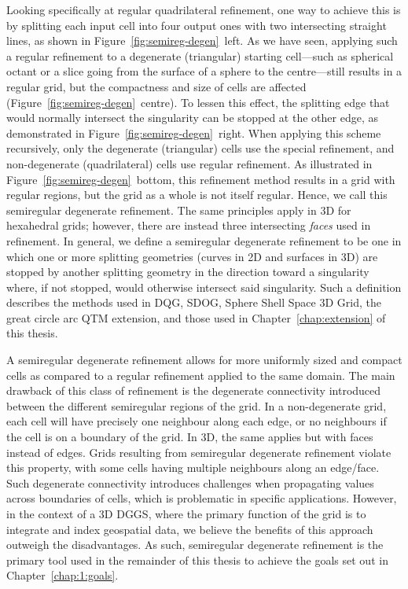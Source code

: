 Looking specifically at regular quadrilateral refinement, one way to achieve this is by splitting each input cell into four output ones with two intersecting straight lines, as shown in Figure~\ref{fig:semireg-degen}~left.
As we have seen, applying such a regular refinement to a degenerate (triangular) starting cell---such as spherical octant or a slice going from the surface of a sphere to the centre---still results in a regular grid, but the compactness and size of cells are affected (Figure~\ref{fig:semireg-degen}~centre).
To lessen this effect, the splitting edge that would normally intersect the singularity can be stopped at the other edge, as demonstrated in Figure~\ref{fig:semireg-degen}~right.
When applying this scheme recursively, only the degenerate (triangular) cells use the special refinement, and non-degenerate (quadrilateral) cells use regular refinement.
As illustrated in Figure~\ref{fig:semireg-degen}~bottom, this refinement method results in a grid with regular regions, but the grid as a whole is not itself regular.
Hence, we call this semiregular degenerate refinement.
The same principles apply in 3D for hexahedral grids; however, there are instead three intersecting \textit{faces} used in refinement.
In general, we define a semiregular degenerate refinement to be one in which one or more splitting geometries (curves in 2D and surfaces in 3D) are stopped by another splitting geometry in the direction toward a singularity where, if not stopped, would otherwise intersect said singularity.
Such a definition describes the methods used in DQG, SDOG, Sphere Shell Space 3D Grid, the great circle arc QTM extension, and those used in Chapter~\ref{chap:extension} of this thesis.


A semiregular degenerate refinement allows for more uniformly sized and compact cells as compared to a regular refinement applied to the same domain.
The main drawback of this class of refinement is the degenerate connectivity introduced between the different semiregular regions of the grid.
In a non-degenerate grid, each cell will have precisely one neighbour along each edge, or no neighbours if the cell is on a boundary of the grid.
In 3D, the same applies but with faces instead of edges.
Grids resulting from semiregular degenerate refinement violate this property, with some cells having multiple neighbours along an edge/face.
Such degenerate connectivity introduces challenges when propagating values across boundaries of cells, which is problematic in specific applications.
However, in the context of a 3D DGGS, where the primary function of the grid is to integrate and index geospatial data, we believe the benefits of this approach outweigh the disadvantages.
As such, semiregular degenerate refinement is the primary tool used in the remainder of this thesis to achieve the goals set out in Chapter~\ref{chap:1:goals}.
